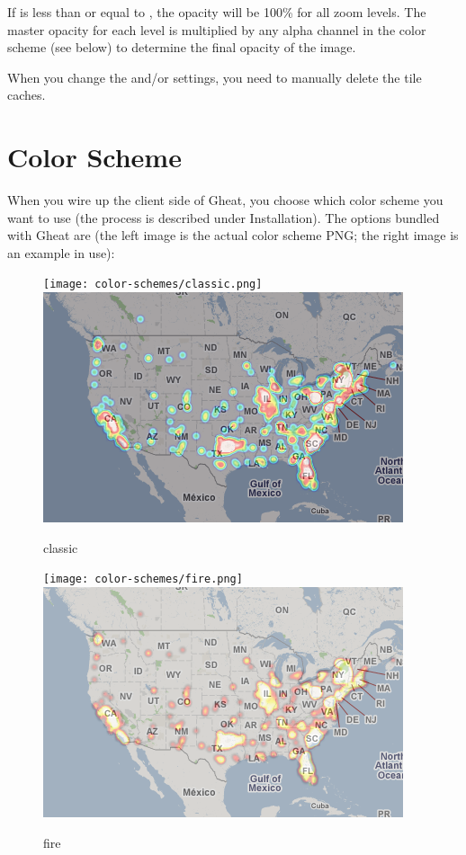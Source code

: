 \documentclass{manual}
\begin{document}
If  is less than or equal to , the
opacity will be 100\% for all zoom levels. The master opacity for each level is
multiplied by any alpha channel in the color scheme (see below) to determine the
final opacity of the image.

When you change the  and/or  settings,
you need to manually delete the tile caches.

\section{Color Scheme}

When you wire up the client side of Gheat, you choose which color scheme you
want to use (the process is described under Installation). The options
bundled with Gheat are (the left image is the actual color scheme PNG; the right
image is an example in use):

\begin{figure}[htp]
\texttt{[image: color-schemes/classic.png]}
\includegraphics[bb=0 0 400 256]{img/cs-classic.png}
\caption{classic}\label{fig:classic}
\end{figure}

\begin{figure}[htp]
\texttt{[image: color-schemes/fire.png]}
\includegraphics[bb=0 0 400 256]{img/cs-fire.png}
\caption{fire}\label{fig:fire}
\end{figure}
\end{document}
